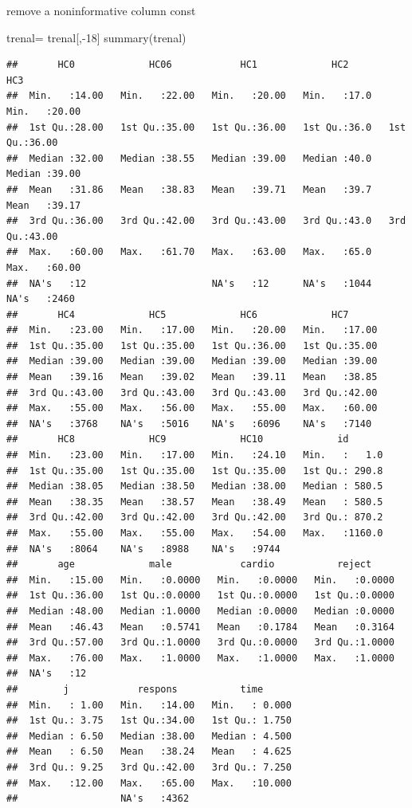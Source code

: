 \documentclass[
]{article}
\newenvironment{Shaded}{\begin{snugshade}}{\end{snugshade}}
\newcommand{\DecValTok}[1]{\textcolor[rgb]{0.00,0.00,0.81}{#1}}
\newcommand{\FunctionTok}[1]{\textcolor[rgb]{0.00,0.00,0.00}{#1}}
\newcommand{\NormalTok}[1]{#1}
\newcommand{\OtherTok}[1]{\textcolor[rgb]{0.56,0.35,0.01}{#1}}
\newcommand{\SpecialCharTok}[1]{\textcolor[rgb]{0.00,0.00,0.00}{#1}}
\begin{document}
remove a noninformative column const

\begin{Shaded}
\begin{Highlighting}[]
\NormalTok{trenal}\OtherTok{=}\NormalTok{ trenal[,}\SpecialCharTok{{-}}\DecValTok{18}\NormalTok{]}
\FunctionTok{summary}\NormalTok{(trenal)}
\end{Highlighting}
\end{Shaded}

\begin{verbatim}
##       HC0             HC06            HC1             HC2            HC3       
##  Min.   :14.00   Min.   :22.00   Min.   :20.00   Min.   :17.0   Min.   :20.00  
##  1st Qu.:28.00   1st Qu.:35.00   1st Qu.:36.00   1st Qu.:36.0   1st Qu.:36.00  
##  Median :32.00   Median :38.55   Median :39.00   Median :40.0   Median :39.00  
##  Mean   :31.86   Mean   :38.83   Mean   :39.71   Mean   :39.7   Mean   :39.17  
##  3rd Qu.:36.00   3rd Qu.:42.00   3rd Qu.:43.00   3rd Qu.:43.0   3rd Qu.:43.00  
##  Max.   :60.00   Max.   :61.70   Max.   :63.00   Max.   :65.0   Max.   :60.00  
##  NA's   :12                      NA's   :12      NA's   :1044   NA's   :2460   
##       HC4             HC5             HC6             HC7       
##  Min.   :23.00   Min.   :17.00   Min.   :20.00   Min.   :17.00  
##  1st Qu.:35.00   1st Qu.:35.00   1st Qu.:36.00   1st Qu.:35.00  
##  Median :39.00   Median :39.00   Median :39.00   Median :39.00  
##  Mean   :39.16   Mean   :39.02   Mean   :39.11   Mean   :38.85  
##  3rd Qu.:43.00   3rd Qu.:43.00   3rd Qu.:43.00   3rd Qu.:42.00  
##  Max.   :55.00   Max.   :56.00   Max.   :55.00   Max.   :60.00  
##  NA's   :3768    NA's   :5016    NA's   :6096    NA's   :7140   
##       HC8             HC9             HC10             id        
##  Min.   :23.00   Min.   :17.00   Min.   :24.10   Min.   :   1.0  
##  1st Qu.:35.00   1st Qu.:35.00   1st Qu.:35.00   1st Qu.: 290.8  
##  Median :38.05   Median :38.50   Median :38.00   Median : 580.5  
##  Mean   :38.35   Mean   :38.57   Mean   :38.49   Mean   : 580.5  
##  3rd Qu.:42.00   3rd Qu.:42.00   3rd Qu.:42.00   3rd Qu.: 870.2  
##  Max.   :55.00   Max.   :55.00   Max.   :54.00   Max.   :1160.0  
##  NA's   :8064    NA's   :8988    NA's   :9744                    
##       age             male            cardio           reject      
##  Min.   :15.00   Min.   :0.0000   Min.   :0.0000   Min.   :0.0000  
##  1st Qu.:36.00   1st Qu.:0.0000   1st Qu.:0.0000   1st Qu.:0.0000  
##  Median :48.00   Median :1.0000   Median :0.0000   Median :0.0000  
##  Mean   :46.43   Mean   :0.5741   Mean   :0.1784   Mean   :0.3164  
##  3rd Qu.:57.00   3rd Qu.:1.0000   3rd Qu.:0.0000   3rd Qu.:1.0000  
##  Max.   :76.00   Max.   :1.0000   Max.   :1.0000   Max.   :1.0000  
##  NA's   :12                                                        
##        j            respons           time       
##  Min.   : 1.00   Min.   :14.00   Min.   : 0.000  
##  1st Qu.: 3.75   1st Qu.:34.00   1st Qu.: 1.750  
##  Median : 6.50   Median :38.00   Median : 4.500  
##  Mean   : 6.50   Mean   :38.24   Mean   : 4.625  
##  3rd Qu.: 9.25   3rd Qu.:42.00   3rd Qu.: 7.250  
##  Max.   :12.00   Max.   :65.00   Max.   :10.000  
##                  NA's   :4362
\end{verbatim}
\end{document}
